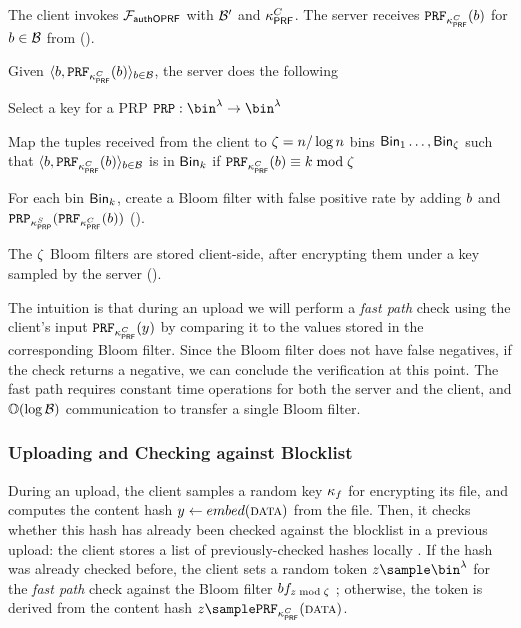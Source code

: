 \enumListStart

\item The client invokes $\mathcal{F}_{\mathsf{authOPRF}}$ with $\blocklist'$ and $\kappa_{\mathsf{PRF}}^{C}$. The server receives  $\prf{\prfKeyClient}(\genericBlocklistElmt)$ for $\genericBlocklistElmt \in \blocklist$ from \authOPRFFunc (). 

\item Given $\langle \genericBlocklistElmt, \prf{\prfKeyClient}(\genericBlocklistElmt) \rangle_{\genericBlocklistElmt \in \blocklist}$, the server does the following

\enumListStart
\item Select a key for a PRP $\prp: \bin^{\secParam} \rightarrow \bin^{\secParam}$
\item Map the tuples received from the client to $\zeta = n/ \log n$ bins $\mathsf{Bin}_{1} \dots, \mathsf{Bin}_{\zeta}$ such that $\langle \genericBlocklistElmt, \prf{\prfKeyClient}(\genericBlocklistElmt) \rangle_{\genericBlocklistElmt \in \blocklist}$ is in $\mathsf{Bin}_{k}$ if $ \prf{\prfKeyClient}(\genericBlocklistElmt) \equiv \bloomFilterIdx \bmod \numBins$
\item For each bin $\mathsf{Bin}_{k}$, create a Bloom filter with false positive rate \bloomFilterEpsilon by adding $\genericBlocklistElmt$ and $\prp{\prpKeyServer}(\prf{\prfKeyClient}(\genericBlocklistElmt))$ (). 
\item The $\zeta$ Bloom filters are stored client-side, after encrypting them under a key sampled by the server ().
\enumListEnd
\enumListEnd

The intuition is that during an upload we will perform a \emph{fast path} check using the client's input $\prf{\prfKeyClient}(\genericCInputElmt)$ by comparing it to the values stored in the corresponding Bloom filter. Since the Bloom filter does not have false negatives, if the check returns a negative, we can conclude the verification at this point. The fast path requires constant time operations for both the server and the client, and $\bigO(\log \blocklist)$ communication to transfer a single Bloom filter. 

\subsubsection{Uploading and Checking against Blocklist}
%
During an upload, the client samples a random key $\kappa_{f}$ for encrypting its file, and computes the content hash $\genericCInputElmt \gets \embed(\clientData)$ from the file. Then, it checks whether this hash has already been checked against the blocklist in a previous upload: the client stores a list of previously-checked hashes locally \prevHashList. If the hash was already checked before, the client sets a random token $\genericCInputElmtPRFEval \getsr \bin^{\secParam}$ for the \emph{fast path} check against the Bloom filter $\bloomFilter[\genericCInputElmtPRFEval \bmod \numBins]$ ; otherwise, the token is derived from the content hash $\genericCInputElmtPRFEval \getsr \prf{\prfKeyClient}(\clientData)$.

